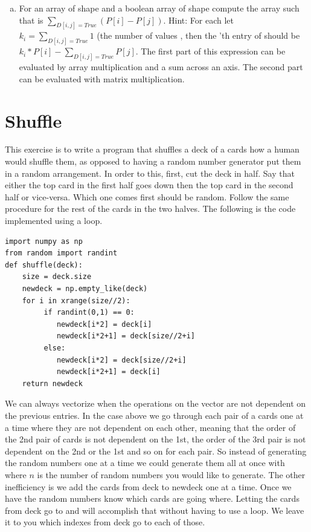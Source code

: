\begin{problem}
\begin{enumerate}[a)]
\item For an array  of shape  and a boolean array of shape  compute the array  such that  is $\sum_{D[i,j] = True} \left( P[i] - P[j]\right)$.
Hint: For each  let $k_i = \sum_{D[i,j] = True} 1$ (the number of  values , then the 'th entry of  should be $k_i * P[i] - \sum_{D[i,j] = True} P[j]$.
The first part of this expression can be evaluated by array multiplication and a sum across an axis.
The second part can be evaluated with matrix multiplication.

\end{enumerate}
\end{problem}

\section*{Shuffle}
This exercise is to write a program that shuffles a deck of a cards how a human would shuffle them, as opposed to having a random number generator put them in a random arrangement.
In order to this, first, cut the deck in half.
Say that either the top card in the first half goes down then the top card in the second half or vice-versa.
Which one comes first should be random.
Follow the same procedure for the rest of the cards in the two halves.
The following is the code implemented using a loop.
\begin{lstlisting}
import numpy as np
from random import randint
def shuffle(deck):
    size = deck.size
    newdeck = np.empty_like(deck)
    for i in xrange(size//2):
         if randint(0,1) == 0:
            newdeck[i*2] = deck[i]
            newdeck[i*2+1] = deck[size//2+i]
         else:
            newdeck[i*2] = deck[size//2+i]
            newdeck[i*2+1] = deck[i]
    return newdeck
\end{lstlisting}

We can always vectorize when the operations on the vector are not dependent on the previous entries. In the case above we go through each pair of a cards one at a time where they are not dependent on each other, meaning that the order of the 2nd pair of cards is not dependent on the 1st, the order of the 3rd pair is not dependent on the 2nd or the 1st and so on for each pair. So instead of generating the random numbers one at a time we could generate them all at once with  where $n$ is the number of random numbers you would like to generate. The other inefficiency is we add the cards from deck to newdeck one at a time.  Once we have the random numbers know which cards are going where.  Letting the cards from deck go to  and  will accomplish that without having to use a loop. We leave it to you which indexes from deck go to each of those.

